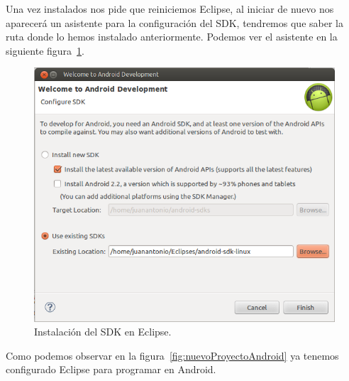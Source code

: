 Una vez instalados nos pide que reiniciemos Eclipse, al iniciar de nuevo nos aparecerá un asistente para la configuración del SDK, tendremos que saber la ruta donde lo hemos instalado anteriormente. Podemos ver el asistente en la siguiente figura~\ref{fig:configuracionSDK}.
 
\begin{figure}
  \centering
    \includegraphics[scale=0.6]{./ConfiguracionEclipse/imagenes/configuracionSDK.png}
  \caption{Instalación del SDK en Eclipse.}
  \label{fig:configuracionSDK}
\end{figure}

Como podemos observar en la figura~\ref{fig:nuevoProyectoAndroid} ya tenemos configurado Eclipse para programar en Android.

